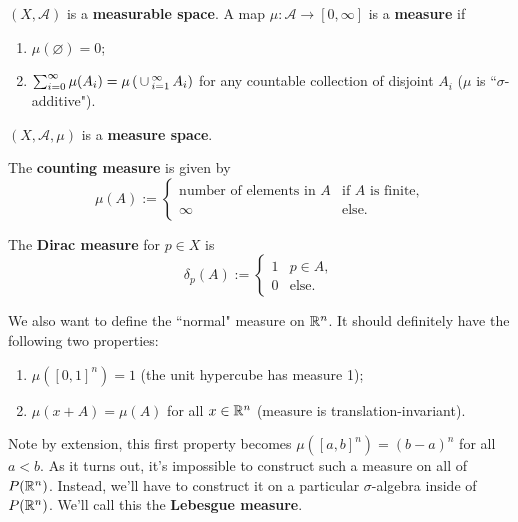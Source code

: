 \documentclass[twoside,10pt]{article}
\begin{document}
\begin{defn}[]
$(X,\mathcal{A})$ is a \textbf{measurable space}. A map $\mu: \mathcal{A} \to [0,\infty]$ is a \textbf{measure} if
\begin{enumerate}
	\item $\mu(\varnothing)=0$;
	\item $\sum_{i=0}^{\infty} \mu(A_{i}) = \mu\left( \operatorname{\,\cup\,}_{i=1}^{\infty}A_{i} \right)$ for any countable collection of disjoint $A_{i}$ ($\mu$ is ``$\sigma$-additive").
\end{enumerate}
$(X,\mathcal{A},\mu)$ is a \textbf{measure space}.
\end{defn}

\begin{ex}[]
The \textbf{counting measure} is given by
\[
\mu(A) :=
\begin{cases}
	\text{number of elements in $A$} & \text{if } A \text{ is finite,} \\
	\infty & \text{else}.
\end{cases}
\] 
\end{ex}

\newpage
\begin{ex}[]
The \textbf{Dirac measure} for $p \in X$ is
\[
\delta_{p}(A) :=
\begin{cases}
	1 & p \in A, \\
	0 & \text{else}.
\end{cases}
\] 
\end{ex}

We also want to define the ``normal" measure on $\mathbb{R}^{n}$. It should definitely have the following two properties:
\begin{enumerate}
	\item $\mu([0,1]^{n}) = 1$ (the unit hypercube has measure 1);
	\item $\mu(x+A) = \mu(A)$ for all $x \in \mathbb{R}^{n}$ (measure is translation-invariant).
\end{enumerate}
Note by extension, this first property becomes $\mu([a,b]^{n}) = (b-a)^{n}$ for all $a < b$. As it turns out, it's impossible to construct such a measure on all of $P(\mathbb{R}^{n})$. Instead, we'll have to construct it on a particular $\sigma$-algebra inside of $P( \mathbb{R}^{n})$. We'll call this the \textbf{Lebesgue measure}.

\begin{prop}
\end{prop}

\end{document}
